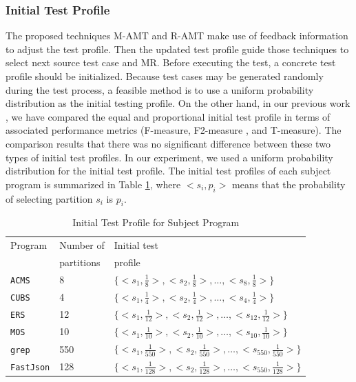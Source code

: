 \documentclass[10pt,journal,compsoc]{IEEEtran}
\begin{document}
\subsubsection{Initial Test Profile}
\label{sec:testprofile}

The proposed techniques M-AMT and R-AMT make use of feedback information to adjust the test profile. Then the updated test profile guide those techniques to select next source test case and MR. Before executing the test, a concrete test profile should be initialized. Because test cases may be generated randomly during the test process, a feasible method is to use a uniform probability distribution as the initial testing profile. On the other hand, in our previous work \cite{sun2018adaptive}, we have compared the equal and proportional initial test profile in terms of associated performance metrics (F-measure, F2-measure \cite{sun2018adaptive}, and T-measure). The comparison results that there was no significant difference between these two types of initial test profiles. In our experiment, we used a uniform probability distribution for the initial test profile. The initial test profiles of each subject program is summarized in Table \ref{tab:initialtf}, where $<s_i,p_i>$ means that the probability of selecting partition $s_i$ is $p_i$.
\begin{table}
  \caption{Initial Test Profile for Subject Program}
  \label{tab:initialtf}
  \centering
  \renewcommand\tabcolsep{2.5pt}
  \begin{tabular}{lll} \toprule
  Program                        &Number of     & Initial test   \\
                                 &partitions    & profile         \\ \midrule
  \texttt{ACMS}                  &8        & $\{<s_1,\frac{1}{8}>,<s_2,\frac{1}{8}>,\ldots,<s_8,\frac{1}{8}>\}$\\
  \texttt{CUBS}                  &4        & $\{<s_1,\frac{1}{4}>,<s_2,\frac{1}{4}>,\ldots,<s_4,\frac{1}{4}>\}$\\
  \texttt{ERS}                   &12       & $\{<s_1,\frac{1}{12}>,<s_2,\frac{1}{12}>,\ldots,<s_{12},\frac{1}{12}>\}$\\
  \texttt{MOS}                   &10       & $\{<s_1,\frac{1}{10}>,<s_2,\frac{1}{10}>,\ldots,<s_{10},\frac{1}{10}>\}$\\
  \texttt{grep}                  &550      & $\{<s_1,\frac{1}{550}>,<s_2,\frac{1}{550}>,\ldots,<s_{550},\frac{1}{550}>\}$\\
  \texttt{FastJson}              &128      & $\{<s_1,\frac{1}{128}>,<s_2,\frac{1}{128}>,\ldots,<s_{550},\frac{1}{128}>\}$\\\bottomrule
  \end{tabular}
\end{table}
\end{document}
